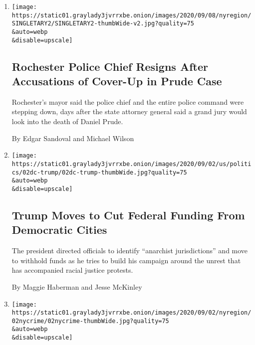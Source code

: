 \begin{enumerate}
\def\labelenumi{\arabic{enumi}.}
\item
  \href{/2020/09/08/nyregion/rochester-police-chief-resigns-prude.html}{}

  \texttt{[image: https://static01.graylady3jvrrxbe.onion/images/2020/09/08/nyregion/SINGLETARY2/SINGLETARY2-thumbWide-v2.jpg?quality=75\\\&auto=webp\\\&disable=upscale]}

  \hypertarget{rochester-police-chief-resigns-after-accusations-of-cover-up-in-prude-case}{%
  \subsection{Rochester Police Chief Resigns After Accusations of
  Cover-Up in Prude
  Case}\label{rochester-police-chief-resigns-after-accusations-of-cover-up-in-prude-case}}

  Rochester's mayor said the police chief and the entire police command
  were stepping down, days after the state attorney general said a grand
  jury would look into the death of Daniel Prude.

  By Edgar Sandoval and Michael Wilson
\item
  \href{/2020/09/02/us/politics/trump-funding-cities.html}{}

  \texttt{[image: https://static01.graylady3jvrrxbe.onion/images/2020/09/02/us/politics/02dc-trump/02dc-trump-thumbWide.jpg?quality=75\\\&auto=webp\\\&disable=upscale]}

  \hypertarget{trump-moves-to-cut-federal-funding-from-democratic-cities}{%
  \subsection{Trump Moves to Cut Federal Funding From Democratic
  Cities}\label{trump-moves-to-cut-federal-funding-from-democratic-cities}}

  The president directed officials to identify ``anarchist
  jurisdictions'' and move to withhold funds as he tries to build his
  campaign around the unrest that has accompanied racial justice
  protests.

  By Maggie Haberman and Jesse McKinley
\item
  \href{/2020/09/02/nyregion/nyc-shootings-murders.html}{}

  \texttt{[image: https://static01.graylady3jvrrxbe.onion/images/2020/09/02/nyregion/02nycrime/02nycrime-thumbWide.jpg?quality=75\\\&auto=webp\\\&disable=upscale]}


\end{enumerate}

